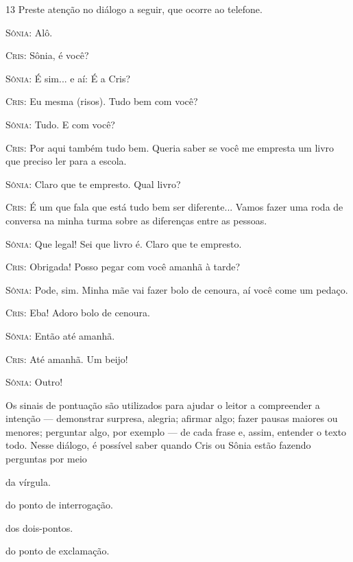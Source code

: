 \num{13} Preste atenção no diálogo a seguir, que ocorre ao telefone.

\begin{myquote}
\textsc{Sônia}: Alô.

\textsc{Cris}: Sônia, é você?

\textsc{Sônia}: É sim... e aí: É a Cris?

\textsc{Cris}: Eu mesma (risos). Tudo bem com você?

\textsc{Sônia}: Tudo. E com você?

\textsc{Cris}: Por aqui também tudo bem. Queria saber se você me empresta um
livro que preciso ler para a escola.

\textsc{Sônia}: Claro que te empresto. Qual livro?

\textsc{Cris}: É um que fala que está tudo bem ser diferente... Vamos fazer uma
roda de conversa na minha turma sobre as diferenças entre as pessoas.

\textsc{Sônia}: Que legal! Sei que livro é. Claro que te empresto.

\textsc{Cris}: Obrigada! Posso pegar com você amanhã à tarde?

\textsc{Sônia}: Pode, sim. Minha mãe vai fazer bolo de cenoura, aí você come um
pedaço.

\textsc{Cris}: Eba! Adoro bolo de cenoura.

\textsc{Sônia}: Então até amanhã.

\textsc{Cris}: Até amanhã. Um beijo!

\textsc{Sônia}: Outro!

\end{myquote}

Os sinais de pontuação são utilizados para ajudar o leitor a compreender
a intenção --- demonstrar surpresa, alegria; afirmar algo; fazer
pausas maiores ou menores; perguntar algo, por exemplo --- de cada
frase e, assim, entender o texto todo. Nesse diálogo, é possível saber
quando Cris ou Sônia estão fazendo perguntas por meio

\begin{escolha}
\item da vírgula.

\item do ponto de interrogação.

\item dos dois-pontos.

\item do ponto de exclamação.
\end{escolha}


